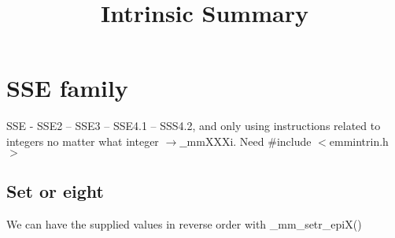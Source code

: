 \documentclass{article}
\begin{document}
\title{Intrinsic Summary}
\maketitle
\newpage
\tableofcontents
\newpage

\section{SSE family}
SSE - SSE2 -- SSE3 -- SSE4.1 -- SSS4.2, and only using instructions related to integers no matter what integer $\rightarrow \_\_$mmXXXi.
\newline 
Need \#include $<$emmintrin.h$>$
\subsection{Set or eight}
We can have the supplied values in reverse order with  \_mm\_setr\_epiX()
\vspace{1cm}
\end{document}
